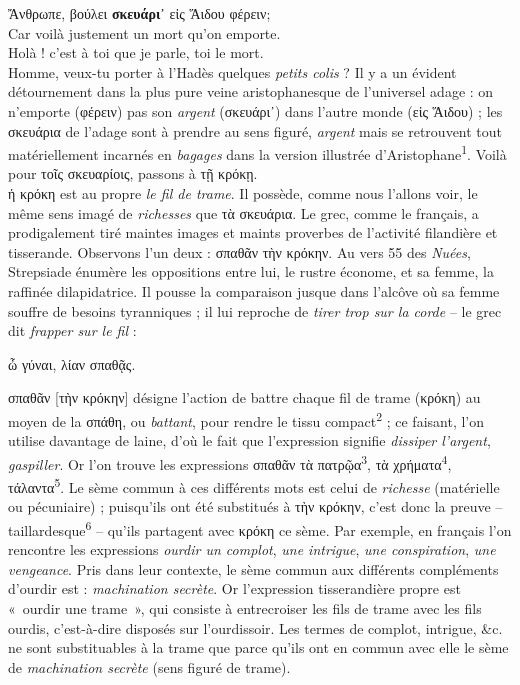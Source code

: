 \documentclass[12pt]{book}%
\newcommand{\italique}[1]{\textit{#1}}%
\newcommand{\citComm}[1]{\begin{quoting}[vskip=0pt] #1 \end{quoting}}%
\newcommand{\francais}[1]{{\policeFr #1}}%
\newcommand{\grec}[1]{#1}%
\newcommand{\marqueur}[1]{\textsuperscript{#1}}%
\newenvironment{groupe}{%
\pstart%
\ledgroup%
}{%
\pend %
}%
\begin{document}
\begin{pages}
\begin{Leftside}
\begin{groupe}
{{{Ἄνθρωπε, βούλει \textbf{σκευάρι᾽} εἰς Ἅιδου φέρειν;\\
\francais{Car voilà justement un mort qu'on emporte.\\
Holà ! c'est à toi que je parle, toi le mort.\\
Homme, veux-tu porter à l'Hadès quelques \italique{petits colis} ?}}%
Il y a un évident détournement dans la plus pure veine aristophanesque de l'universel adage : on n'emporte (φέρειν) pas son \italique{argent} (σκευάρι᾽) dans l'autre monde (εἰς Ἅιδου) ; les σκευάρια de l'adage sont à prendre au sens figuré, \italique{argent} mais se retrouvent tout matériellement incarnés en \italique{bagages} dans la version illustrée d'Aristophane\marqueur{1}. Voilà pour τοῖς σκευαρίοις, passons à τῇ κρόκῃ.\\
\grec{ἡ κρόκη} est au propre \italique{le fil de trame}. 
Il possède, comme nous l'allons voir, le même sens imagé de \italique{richesses} que τὰ σκευάρια.
Le grec, comme le français, a prodigalement tiré maintes images et maints proverbes de l'activité filandière et tisserande. Observons l'un deux : σπαθᾶν τὴν κρόκην.
Au vers 55 des \italique{Nuées}, Strepsiade énumère les oppositions entre lui, le rustre économe, et sa femme, la raffinée dilapidatrice. Il pousse la comparaison jusque dans l'alcôve où sa femme souffre de besoins tyranniques ; il lui reproche de \italique{tirer trop sur la corde} -- le grec dit \italique{frapper sur le fil} :%
\citComm{ὦ γύναι, λίαν σπαθᾷς.}%
σπαθᾶν [τὴν κρόκην] désigne l'action de battre chaque fil de trame (κρόκη) au moyen de la σπάθη, ou \italique{battant}, pour rendre le tissu compact\marqueur{2} ; ce faisant, l'on utilise davantage de laine, d'où le fait que l'expression signifie \italique{dissiper l'argent}, \italique{gaspiller}.
Or l'on trouve les expressions σπαθᾶν τὰ πατρῷα\marqueur{3}, τὰ χρήματα\marqueur{4}, τάλαντα\marqueur{5}. 
Le sème commun à ces différents mots est celui de \italique{richesse} (matérielle ou pécuniaire) ; puisqu'ils ont été substitués à τὴν κρόκην, c'est donc la preuve -- taillardesque\marqueur{6} -- qu'ils partagent avec κρόκη ce sème.
Par exemple, en français l'on rencontre les expressions \italique{ourdir un complot}, \italique{une intrigue}, \italique{une conspiration}, \italique{une vengeance}. Pris dans leur contexte, le sème commun aux différents compléments d'ourdir est : \italique{machination secrète}. Or l'expression tisserandière propre est «~ourdir une trame~», qui consiste à entrecroiser les fils de trame avec les fils ourdis, c'est-à-dire disposés sur l'ourdissoir. Les termes de complot, intrigue, \&c. ne sont substituables à la trame que parce qu'ils ont en commun avec elle le sème de \italique{machination secrète} (sens figuré de trame).\\
}}
\end{groupe}
\end{Leftside}
\end{pages}
\end{document}
